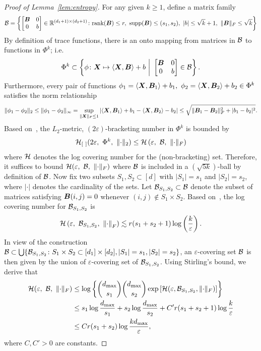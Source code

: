 \documentclass[11pt]{article}
\theoremstyle{plain}
\theoremstyle{definition}
\def\rank{\textup{rank}}
\def\supp{\textup{supp}}
\begin{document}
\begin{proof}[Proof of Lemma~\ref{lem:entropy}]
For any given $k\geq 1$, define a matrix family
\begin{align}
\tB=\left\{
\begin{bmatrix}
\mB& 0\\
0 & b\\
 \end{bmatrix}
 \in\mathbb{R}^{(d_1+1) \times (d_2+1)} \colon \rank(\mB)\leq r,\ \supp(\mB)\leq (s_1,s_2),\ |b|\leq \sqrt{k}+1, \ \FnormSize{}{\mB}\leq  \sqrt{k}
 \right\}
 \end{align}
By definition of trace functions, there is an onto mapping from matrices in $\mathcal{B}$ to functions in $\Phi^k$; i.e. 
\[
\Phi^{k} \subset \left\{\phi\colon\mX\mapsto\langle \mX,\mB\rangle+b\ \bigg| \ \begin{bmatrix}
\mB& 0\\
0 & b\\
 \end{bmatrix}
 \in \tB\right\}.
\]
Furthermore, every pair of functions $\phi_1=\langle\mX, \mB_1\rangle+b_1,\ \phi_2=\langle \mX,\mB_2\rangle+b_2\in\Phi^k$ satisfies the norm relationship
\[
\lVert\phi_1-\phi_2\rVert_2\leq \lVert\phi_1-\phi_2\rVert_\infty =\sup_{\lVert\bm X\rVert_F\leq 1}|\langle \bm X,\bm B_1\rangle+b_1 -\langle \bm X,\bm B_2\rangle  -b_2|\leq \sqrt{\lVert\bm B_1-\bm B_2\rVert_F^2+|b_1-b_2|^2}.
\]
Based on~\citet[Theorem 9.23]{kosorok2007introduction}, the $L_2$-metric, $(2\varepsilon)$-bracketing number in $\Phi^k$ is bounded by
\[
\tH_{[\ ]}(2\varepsilon,\ \Phi^k,\ \vnormSize{}{\cdot}) \leq \tH \left(\varepsilon,\ \tB,\ \FnormSize{}{\cdot}\right)
\]
where $\mathcal{H}$ denotes the log covering number for the (non-bracketing) set. Therefore, it suffices to bound $\tH(\varepsilon,\ \tB,\ \FnormSize{}{\cdot})$ where $\mathcal{B}$ is included in a $(\sqrt{5k})$-ball by definition of $\mathcal{B}$. Now fix two subsets $S_1,S_2\subset [d]$ with $|S_1|=s_1$ and $|S_2|=s_2$, where $|\cdot|$ denotes the cardinality of the sets. Let $\mathcal{B}_{S_1,S_2}\subset \mathcal{B}$ denote the subset of matrices satisfying $\bm B(i,j)=0$ whenever $(i,j)\notin S_1\times S_2$. Based on~\citet[Lemma 3.1]{candes2011tight}, the log covering number for $\mathcal{B}_{S_1,S_2}$ is
\begin{align}\label{eq:bracketsparse}
\mathcal{H} \left(\varepsilon,\ \mathcal{B}_{S_1,S_2},\ \left\lVert\cdot\right\rVert_F\right)\lesssim r(s_1+s_2+1)\log\left({k\over \varepsilon}\right).
\end{align}
In view of the construction $\mathcal{B}\subset\bigcup\{\mathcal{B}_{S_1,S_2}\colon S_1\times S_2\subset [d_1]\times[d_2], |S_1|=s_1, |S_2|=s_2\}$, an $\varepsilon$-covering set $\mathcal{B}$ is then given by the union of $\varepsilon$-covering set of $\mathcal{B}_{S_1,S_2}$. Using Stirling's bound, we derive that 
\begin{align}
\mathcal{H}(\varepsilon,\ \mathcal{B},\ \lVert\cdot\rVert_F)&\leq \log \left\{{d_{\max} \choose s_1}{d_{\max} \choose s_2}\exp\left[\mathcal{H}(\varepsilon,\mathcal{B}_{S_1,S_2},\lVert\cdot\rVert_F)\right]\right\}
\\
&\leq s_1 \log {d_{\max}\over s_1}+s_2\log {d_{\max}\over s_2}+C'r(s_1+s_2+1)\log{k\over \varepsilon}\\
& \leq Cr(s_1+s_2)\log{kd_{\max}\over \varepsilon},
\end{align}
where $C,C'>0$ are constants. 


\end{proof}
\end{document}
